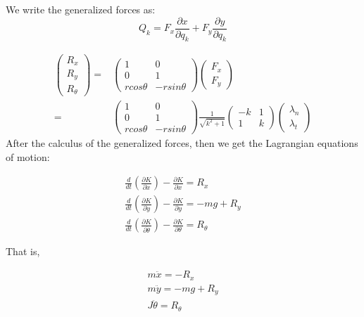 We write the generalized forces as:
\begin{equation}
Q_k=F_x\frac{\partial x}{\partial q_k} + F_y\frac{\partial y}{\partial q_k}
\end{equation}

\begin{equation}
\begin{aligned}
\begin{pmatrix}
R_x \\ R_y \\R_{\theta}
\end{pmatrix}
=&\begin{pmatrix}
1 & 0 \\
0 & 1 \\
rcos\theta & -rsin\theta
\end{pmatrix}
\begin{pmatrix}
F_x\\F_y
\end{pmatrix}\\
=&\begin{pmatrix}
1 & 0 \\
0 & 1 \\
rcos\theta & -rsin\theta
\end{pmatrix}
\frac{1}{\sqrt{k^2+1}}\begin{pmatrix}
-k & 1\\
1 & k \end{pmatrix}
\begin{pmatrix}
\lambda_n \\ \lambda_t
\end{pmatrix}
\end{aligned}
\end{equation}
After the calculus of the generalized forces, then we get the Lagrangian equations of motion:

\begin{eqnarray}
&\frac{d}{dt}(\frac{\partial K}{\partial \dot{x}})-\frac{\partial K}{\partial x}=R_x& \label{k2} \\
&\frac{d}{dt}(\frac{\partial K}{\partial \dot{y}})-\frac{\partial K}{\partial y}=-mg+R_y& \label{k3} \\
&\frac{d}{dt}(\frac{\partial K}{\partial \dot{\theta}})-\frac{\partial K}{\partial \theta}=R_{\theta}\label{k2} 
\end{eqnarray}


That is,

\begin{eqnarray}
&m\ddot{x}=-R_x&\\
&m\ddot{y}=-mg+R_y&\\
&J\ddot{\theta}=R_{\theta}&
\end{eqnarray}

